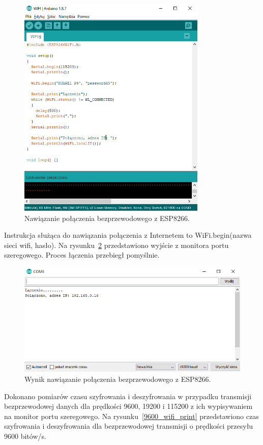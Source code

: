 \documentclass[12p]{article}
\begin{document}
\begin{figure}[H]
\centering
\includegraphics[width=9cm]{laczenie_wifi.png}
\caption{Nawiązanie połączenia bezprzewodowego z ESP8266.}\label{laczenie_wifi}
\end{figure}
\newpage
Instrukcja służąca do nawiązania połączenia z Internetem to WiFi.begin(nazwa sieci wifi, hasło). Na rysunku~\ref{polaczenie_wifi} przedstawiono wyjście z monitora portu szeregowego. Proces łączenia przebiegł pomyślnie.

\begin{figure}[H]
\centering
\includegraphics[width=12cm]{polaczenie_wifi.png}
\caption{Wynik nawiązanie połączenia bezprzewodowego z ESP8266.}\label{polaczenie_wifi}
\end{figure}

Dokonano pomiarów czasu szyfrowania i deszyfrowania w przypadku transmisji bezprzewodowej danych dla prędkości 9600, 19200 i 115200 z ich wypisywaniem na monitor portu szeregowego. Na rysunku~\ref{9600_wifi_print} przedstawiono czas szyfrowania i deszyfrowania dla bezprzewodowej transmisji o prędkości przesyłu 9600 bitów/s.
\end{document}
